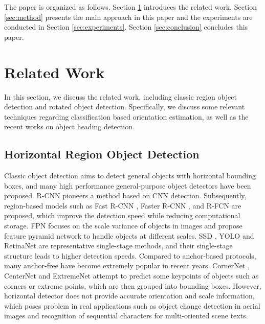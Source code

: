 \documentclass[10pt,journal,compsoc]{IEEEtran}
\begin{document}
The paper is organized as follows. Section \ref{sec:related} introduces the related work. Section \ref{sec:method} presents the main approach in this paper and the experiments are conducted in Section \ref{sec:experiments}. Section \ref{sec:conclusion} concludes this paper.

\section{Related Work}\label{sec:related}
In this section, we discuss the related work, including classic region object detection and rotated object detection. Specifically, we discuss some relevant techniques regarding classification based orientation estimation, as well as the recent works on object heading detection.

\subsection{Horizontal Region Object Detection} 
Classic object detection aims to detect general objects with horizontal bounding boxes, and many high performance general-purpose object detectors have been proposed. R-CNN \cite{girshick2014rich} pioneers a method based on CNN detection. Subsequently, region-based models such as Fast R-CNN \cite{girshick2015fast}, Faster R-CNN \cite{ren2015faster}, and R-FCN \cite{dai2016r} are proposed, which improve the detection speed while reducing computational storage. FPN \cite{lin2017feature} focuses on the scale variance of objects in images and propose feature pyramid network to handle objects at different scales. SSD \cite{liu2016ssd}, YOLO \cite{redmon2016you} and RetinaNet \cite{lin2017focal} are representative single-stage methods, and their single-stage structure leads to higher detection speeds. Compared to anchor-based protocols, many anchor-free have become extremely popular in recent years. CornerNet \cite{law2018cornernet}, CenterNet \cite{duan2019centernet} and ExtremeNet \cite{zhou2019bottom} attempt to predict some keypoints of objects such as corners or extreme points, which are then grouped into bounding boxes. However, horizontal detector does not provide accurate orientation and scale information, which poses problem in real applications such as object change detection in aerial images and recognition of sequential characters for multi-oriented scene texts.
	
\end{document}
